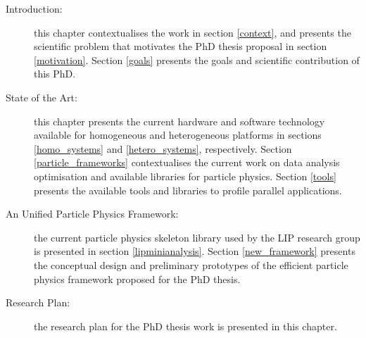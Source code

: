 \begin{description}
	\item[Introduction:] this chapter contextualises the work in section \ref{context}, and presents the scientific problem that motivates the PhD thesis proposal in section \ref{motivation}. Section \ref{goals} presents the goals and scientific contribution of this PhD.
	\item[State of the Art:] this chapter presents the current hardware and software technology available for homogeneous and heterogeneous platforms in sections \ref{homo_systems} and \ref{hetero_systems}, respectively. Section \ref{particle_frameworks} contextualises the current work on data analysis optimisation and available libraries for particle physics. Section \ref{tools} presents the available tools and libraries to profile parallel applications.
	\item[An Unified Particle Physics Framework:] the current particle physics skeleton library used by the LIP research group is presented in section \ref{lipminianalysis}. Section \ref{new_framework} presents the conceptual design and preliminary prototypes of the efficient particle physics framework proposed for the PhD thesis.
	\item[Research Plan:] the research plan for the PhD thesis work is presented in this chapter.
\end{description}

